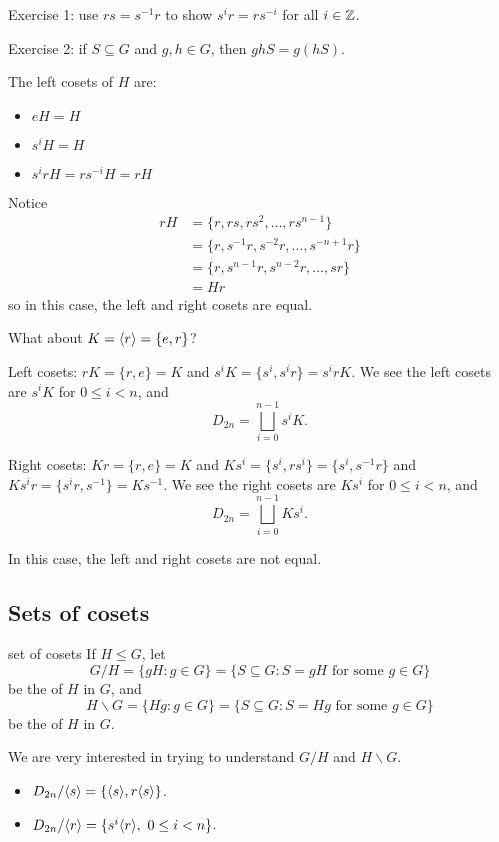 \documentclass[12pt,letterpaper]{report}
\begin{document}
Exercise 1: use $rs = s^{-1}r$ to show $s^i r = rs^{-i}$ for all $i \in \mathbb{Z}$.

Exercise 2: if $S \subseteq G$ and $g, h \in G$, then $ghS = g(hS)$.

The left cosets of $H$ are:
\begin{itemize}
  \item $eH = H$
  \item $s^i H = H$
  \item $s^i r H = rs^{-i}H = rH$
\end{itemize}

Notice
\begin{align*}
  rH &= \{r, rs, rs^2, \ldots, rs^{n - 1}\} \\
  &= \{r, s^{-1}r, s^{-2}r, \ldots, s^{-n + 1}r\} \\
  &= \{r, s^{n - 1}r, s^{n - 2}r, \ldots, sr\} \\
  &= Hr
\end{align*}
so in this case, the left and right cosets are equal.

What about $K = \langle r\rangle = \{e, r\}$?

Left cosets: $rK = \{r, e\} = K$ and $s^iK = \{s^i, s^i r\} = s^i rK$.
We see the left cosets are $s^i K$ for $0 \leq i < n$, and
\[ D_{2n} = \bigsqcup_{i = 0}^{n - 1} s^i K. \]

Right cosets: $Kr = \{r, e\} = K$ and $Ks^i = \{s^i, rs^i\} = \{s^i, s^{-1}r\}$ and
$Ks^i r = \{s^i r, s^{-1}\} = Ks^{-1}$.
We see the right cosets are $K s^i$ for $0 \leq i < n$, and
\[ D_{2n} = \bigsqcup_{i = 0}^{n - 1} Ks^i. \]

In this case, the left and right cosets are not equal.

\pagebreak
\subsection{Sets of cosets}

\begin{defn}{set of cosets}{}
  If $H \leq G$, let
  \[ G/H = \{gH : g \in G\} = \{S \subseteq G: S = gH \text{ for some } g \in G\} \]
  be the  of $H$ in $G$, and
  \[ H \backslash G = \{Hg: g \in G\} = \{S \subseteq G : S = Hg \text{ for some } g \in G\} \]
  be the  of $H$ in $G$.
\end{defn}

We are very interested in trying to understand $G/H$ and $H \backslash G$.

\begin{ex}
  \begin{itemize}
    \item $D_{2n} / \langle s\rangle = \{\langle s\rangle, r\langle s\rangle\}$.
    \item $D_{2n} / \langle r\rangle = \{s^i \langle r\rangle, \ 0 \leq i < n\}$.
  \end{itemize}
\end{ex}
\end{document}
